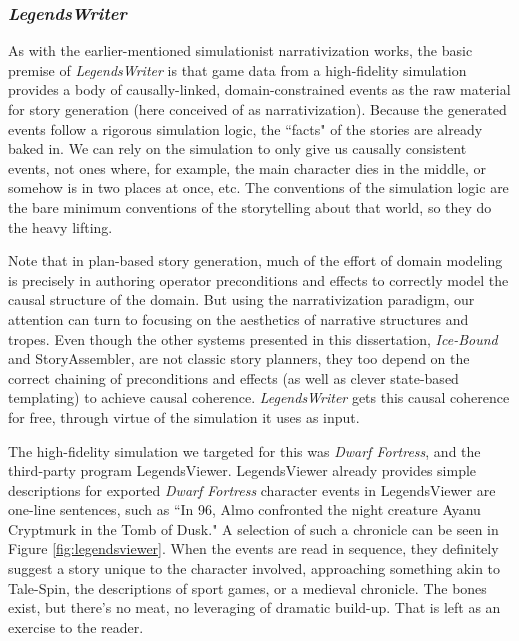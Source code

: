 \subsubsection{\textit{LegendsWriter}}\label{subsubsec:legendswriter}

As with the earlier-mentioned simulationist narrativization works, the basic premise of \textit{LegendsWriter} is that game data from a high-fidelity simulation provides a body of causally-linked, domain-constrained events as the raw material for story generation (here conceived of as narrativization). Because the generated events follow a rigorous simulation logic, the ``facts" of the stories are already baked in. We can rely on the simulation to only give us causally consistent events, not ones where, for example, the main character dies in the middle, or somehow is in two places at once, etc. The conventions of the simulation logic are the bare minimum conventions of the storytelling about that world, so they do the heavy lifting.

Note that in plan-based story generation, much of the effort of domain modeling is precisely in authoring operator preconditions and effects to correctly model the causal structure of the domain. But using the narrativization paradigm, our attention can turn to focusing on the aesthetics of narrative structures and tropes. Even though the other systems presented in this dissertation, \textit{Ice-Bound} and StoryAssembler, are not classic story planners, they too depend on the correct chaining of preconditions and effects (as well as clever state-based templating) to achieve causal coherence. \textit{LegendsWriter} gets this causal coherence for free, through virtue of the simulation it uses as input. 

The high-fidelity simulation we targeted for this was \textit{Dwarf Fortress}, and the third-party program LegendsViewer. LegendsViewer already provides simple descriptions for exported \textit{Dwarf Fortress} character events in LegendsViewer are one-line sentences, such as ``In 96, Almo confronted the night creature Ayanu Cryptmurk in the Tomb of Dusk." A selection of such a chronicle can be seen in Figure \ref{fig:legendsviewer}. When the events are read in sequence, they definitely suggest a story unique to the character involved, approaching something akin to Tale-Spin, the descriptions of sport games, or a medieval chronicle. The bones exist, but there's no meat, no leveraging of dramatic build-up. That is left as an exercise to the reader.

